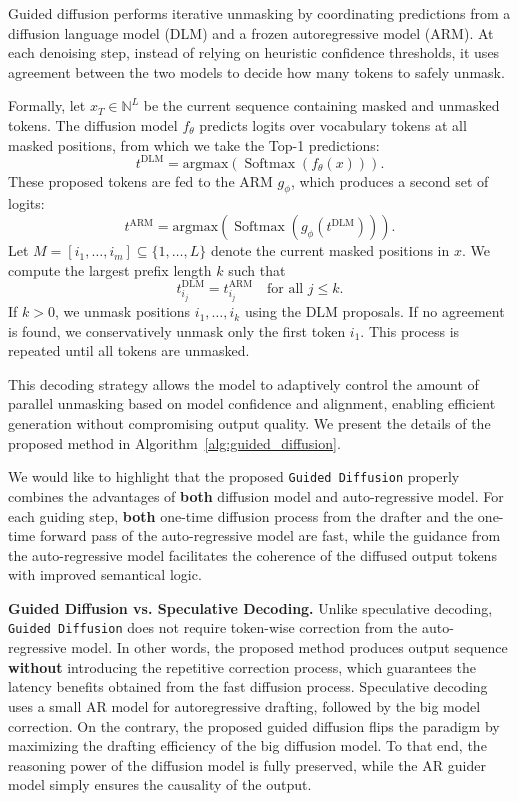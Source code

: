 Guided diffusion performs iterative unmasking by coordinating predictions from a diffusion language model (DLM) and a frozen autoregressive model (ARM). At each denoising step, instead of relying on heuristic confidence thresholds, it uses agreement between the two models to decide how many tokens to safely unmask.

Formally, let \( x_T \in \mathbb{N}^L \) be the current sequence containing masked and unmasked tokens. The diffusion model \( f_\theta \) predicts logits over vocabulary tokens at all masked positions, from which we take the Top-1 predictions:
\[
t^{\text{DLM}} = \text{argmax}( \operatorname{Softmax}(f_\theta(x))).
\]
These proposed tokens are fed to the ARM \( g_\phi \), which produces a second set of logits:
\[
t^{\text{ARM}} = \text{argmax}( \operatorname{Softmax}(g_\phi(t^{\text{DLM}}))).
\]
Let \( M = [i_1, \dots, i_m] \subseteq \{1, \dots, L\} \) denote the current masked positions in \(x\). We compute the largest prefix length \(k\) such that
\[
t^{\text{DLM}}_{i_j} = t^{\text{ARM}}_{i_j} \quad \text{for all } j \le k.
\]
If \(k > 0\), we unmask positions \(i_1, \dots, i_k\) using the DLM proposals. If no agreement is found, we conservatively unmask only the first token \(i_1\). This process is repeated until all tokens are unmasked.

This decoding strategy allows the model to adaptively control the amount of parallel unmasking based on model confidence and alignment, enabling efficient generation without compromising output quality.
We present the details of the proposed method in Algorithm~\ref{alg:guided_diffusion}.

We would like to highlight that the proposed \texttt{Guided Diffusion} properly combines the advantages of \textbf{both} diffusion model and auto-regressive model. 
For each guiding step, \textbf{both} one-time diffusion process from the drafter and the one-time forward pass of the auto-regressive model are fast, while the guidance from the auto-regressive model facilitates the coherence of the diffused output tokens with improved semantical logic. 

\textbf{Guided Diffusion vs. Speculative Decoding.} 
Unlike speculative decoding, \texttt{Guided Diffusion} does not require token-wise correction from the auto-regressive model. In other words, the proposed method produces output sequence \textbf{without} introducing the repetitive correction process, which guarantees the latency benefits obtained from the fast diffusion process. 
Speculative decoding uses a small AR model for autoregressive drafting, followed by the big model correction. On the contrary, the proposed guided diffusion flips the paradigm by maximizing the drafting efficiency of the big diffusion model. To that end, the reasoning power of the diffusion model is fully preserved, while the AR guider model simply ensures the causality of the output. 


